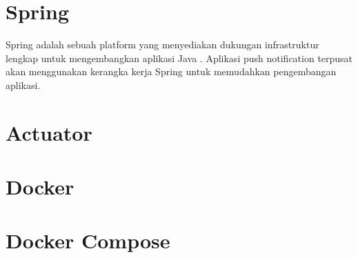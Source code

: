 \section{Spring}
\par Spring adalah sebuah platform yang menyediakan dukungan infrastruktur lengkap untuk mengembangkan aplikasi Java \cite{spring-online}. Aplikasi push notification terpusat akan menggunakan kerangka kerja Spring untuk memudahkan pengembangan aplikasi.

\section{Actuator}

\section{Docker}

\section{Docker Compose}
